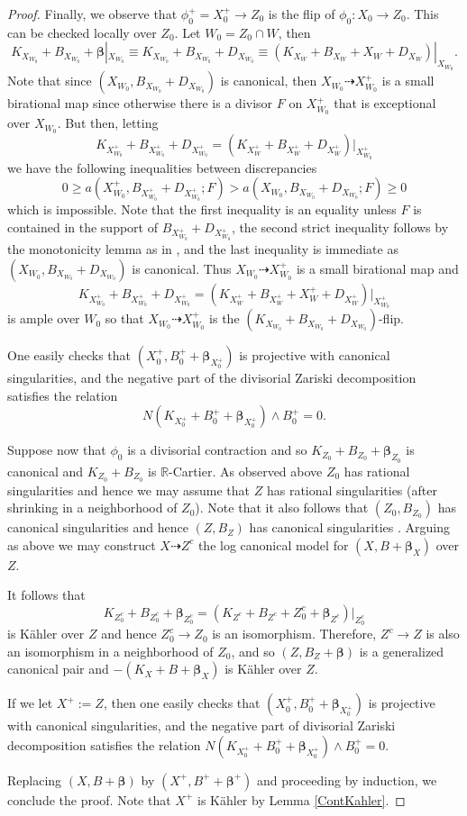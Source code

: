 \documentclass[12pt]{amsart}
\numberwithin{equation}{section}
\theoremstyle{definition}
\theoremstyle{plain}
\newtheorem*{thm A*}{Theorem A}
\newtheorem*{thm B*}{Theorem B}
\newtheorem*{thm C*}{Theorem C}
\newtheorem*{thm D*}{Theorem D}
\theoremstyle{definition}
\renewcommand{\1}{\mathds{1}}
\newcommand{\bbeta}{\boldsymbol{\beta}}
\renewcommand{\>}{\rightarrow}
\newcommand{\R}{\mathbb R}
\begin{document}
\begin{proof}
Finally, we observe that $\phi ^+_0=X^+_0\to Z_0$ is the flip of $\phi _0:X_0\to Z_0$. This can be checked locally over $Z_0$. Let $W_0=Z_0\cap W$, then \[K_{X_{W_0}}+B_{X_{W_0}}+\bbeta |_{X_{W_0}}\equiv K_{X_{W_0}}+B_{X_{W_0}}+D_{X_{W_0}}\equiv  (K_{X_{W}}+B_{X_{W}}+X_{W}+D_{X_W})|_{X_{W_0}}.\] 
Note that since $({X_{W_0}},B_{X_{W_0}}+D_{X_{W_0}})$ is canonical, then $X_{W_0}\dasharrow X^+_{W_0}$ is a small birational map since otherwise there is a divisor $F$ on $X_{W_0}^+$ that is exceptional over $X_{W_0}$. But then, letting $$K_{X_{W_0}^+}+B_{X^+_{W_0}}+D_{X^+_{W_0}}=(K_{X_{W}^+}+B_{X^+_{W}}+D_{X^+_{W}})|_{X^+_{W_0}}$$ we have the following inequalities between discrepancies \[0\ge a(X_{W_0}^+,B_{X^+_{W_0}}+D_{X^+_{W_0}};F)>a(X_{W_0},B_{X_{W_0}}+D_{X_{W_0}};F)\ge 0\] which is impossible. 
Note that the first inequality is an equality unless $F$ is contained in the support of $B_{X^+_{W_0}}+D_{X^+_{W_0}}$, the second strict inequality follows by the monotonicity lemma as in \cite[Lemma 3.38]{KM98}, and the last inequality is immediate as $(X_{W_0},B_{X_{W_0}}+D_{X_{W_0}})$ is canonical. Thus $X_{W_0}\dasharrow X_{W_0}^+$ is a small birational map and $$K_{X_{W_0}^+}+B_{X^+_{W_0}}+D_{X^+_{W_0}}=(K_{X_{W}^+}+B_{X^+_{W}}+X^+_{W}+D_{X^+_{W}})|_{X^+_{W_0}}$$ is ample over $W_0$ so that $X_{W_0}\dasharrow X_{W_0}^+$ is the $(K_{X_{W_0}}+B_{X_{W_0}}+D_{X_{W_0}})$-flip.
    
One easily checks that $(X_0^+, B_0^+ + \bbeta _{X^+_0})$ is projective with  canonical singularities, and the negative part of the divisorial Zariski decomposition satisfies the relation $$N (K_{X_0^+} + B_0^+ + \bbeta _{X^+_0}) \wedge B_0^+  = 0.$$ 


Suppose now that $\phi _0$ is a divisorial contraction and so $K_{Z_0}+B_{Z_0}+\bbeta _{Z_0}$ is canonical and $K_{Z_0}+B_{Z_0}$ is $\R$-Cartier. As observed above $Z_0$ has rational singularities and hence we may assume that $Z$ has rational singularities (after shrinking in a neighborhood of $Z_0$). Note that it also follows that $(Z_0,B_{Z_0})$ has canonical singularities and hence $(Z,B_Z)$ has canonical singularities \cite[Proposition 3.5]{FH11}.
Arguing as above we may construct $X\dasharrow Z^c$ the log canonical model for $(X,B+\bbeta _X)$ over $Z$.

It follows that $$K_{Z_0^c}+B_{Z^c_0}+\bbeta _{Z^c_0}=(K_{Z^c}+B_{Z^c}+Z^c_0+\bbeta _{Z^c})|_{Z^c_0}$$ is K\"ahler over $Z$ and hence $Z^c_0\to Z_0$ is an isomorphism. Therefore, $Z^c\to Z$ is also an isomorphism in a neighborhood of $Z_0$, and so $(Z,B_Z+\bbeta)$ is a generalized canonical pair and $-(K_X+B+\bbeta _X)$ is K\"ahler over $Z$. 

If we let $X^+:=Z$, then one easily checks that $(X_0^+, B_0^+ + \bbeta _{X^+_0})$ is projective with 
canonical singularities, and the negative part of divisorial Zariski
decomposition satisfies the relation $N (K_{X_0^+} + B_0^+ + \bbeta _{X^+_0}) \wedge B_0^+  = 0$.  

Replacing $(X,B+\bbeta)$ by $(X^+,B^++\bbeta^+)$ and proceeding by induction, we conclude the proof. Note that $X^+$ is K\"ahler by Lemma \ref{ContKahler}.
\end{proof}
\end{document}
